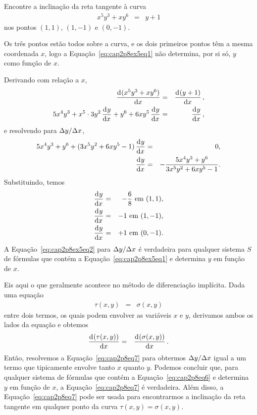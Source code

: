 \begin{example}
Encontre a inclinação da reta tangente à curva
\begin{eqnarray}
  x^5y^3 + xy^6 & = & y + 1 \label{eq:cap2p8ex5eq1}
\end{eqnarray}
nos pontos $(1, 1)$, $(1, -1)$ e $(0, -1)$.

Os três pontos estão todos sobre a curva, e os dois primeiros pontos têm a
mesma coordenada $x$, logo a Equação~\ref{eq:cap2p8ex5eq1} não determina,
por si só, $y$ como função de $x$.

Derivando com relação a $x$,
\begin{eqnarray*}
  \dod{(x^5y^3 + xy^6)}{x} &  = & \dod{(y+1)}{x}, \\
  5x^4y^3 + x^5 \cdot 3y^2\dod y x + y^6 + 6xy^5 \dod y x & = & \dod y x,
\end{eqnarray*}
e resolvendo para $\Delta{y}/\Delta{x}$,
\begin{eqnarray}
  5x^4y^3 + y^6 + (3x^5y^2 + 6xy^5 - 1)\dod y x & = & 0, \notag \\
  \dod y x & = & -\frac{5x^4y^3 + y^6}{3x^5y^2 + 6xy^5 - 1}. \label{eq:cap2p8ex5eq2}
\end{eqnarray}
Substituindo, temos
\begin{eqnarray*}
 \dod y x & = & -\frac{6}{8} \text{ em } (1, 1), \\
 \dod y x & = & -1 \text{ em } (1, -1), \\
 \dod y x & = & +1 \text{ em } (0, -1).
\end{eqnarray*}
A Equação~\ref{eq:cap2p8ex5eq2} para $\Delta{y}/\Delta{x}$ é verdadeira para qualquer
sistema $S$ de fórmulas que contém a Equação~\ref{eq:cap2p8ex5eq1} e determina
$y$ em função de $x$.
\end{example}

Eis aqui o que geralmente acontece no método de diferenciação implícita.
Dada uma equação
\begin{eqnarray}
  \tau(x,y) & = & \sigma(x,y) \label{eq:cap2p8eq6}
\end{eqnarray}
entre dois termos, os quais podem envolver as variáveis $x$ e $y$,
derivamos ambos os lados da equação e obtemos
\begin{eqnarray}
  \dod{(\tau(x,y))}{x} & = & \dod{(\sigma(x,y))}{x}. \label{eq:cap2p8eq7}
\end{eqnarray}
Então, resolvemos a Equação~\ref{eq:cap2p8eq7} para obtermos $\Delta{y}/\Delta{x}$
igual a um termo que tipicamente envolve tanto $x$ quanto $y$. Podemos
concluir que, para qualquer sistema de fórmulas que contém a
Equação~\ref{eq:cap2p8eq6} e determina $y$ em função de $x$, a
Equação~\ref{eq:cap2p8eq7} é verdadeira. Além disso, a
Equação~\ref{eq:cap2p8eq7} pode ser usada para encontrarmos a inclinação
da reta tangente em qualquer ponto da curva $\tau(x,y) = \sigma(x,y)$.

\begin{sectionproblems}
\end{sectionproblems}

\begin{chapterproblems}
\end{chapterproblems}


